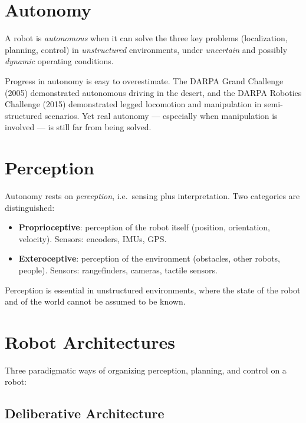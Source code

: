 \section{Autonomy}
\label{sec:autonomy}

\begin{definition}[Autonomy]
A robot is \emph{autonomous} when it can solve the three key problems
(localization, planning, control) in \emph{unstructured} environments,
under \emph{uncertain} and possibly \emph{dynamic} operating conditions.
\end{definition}

Progress in autonomy is easy to overestimate. The DARPA Grand Challenge
(2005) demonstrated autonomous driving in the desert, and the DARPA
Robotics Challenge (2015) demonstrated legged locomotion and
manipulation in semi-structured scenarios. Yet real autonomy ---
especially when manipulation is involved --- is still far from being
solved.

\section{Perception}
\label{sec:perception}

Autonomy rests on \emph{perception}, i.e.\ sensing plus interpretation.
Two categories are distinguished:

\begin{itemize}
    \item \textbf{Proprioceptive}: perception of the robot itself
          (position, orientation, velocity). Sensors: encoders, IMUs, GPS.
    \item \textbf{Exteroceptive}: perception of the environment
          (obstacles, other robots, people). Sensors: rangefinders,
          cameras, tactile sensors.
\end{itemize}

Perception is essential in unstructured environments, where the state of
the robot and of the world cannot be assumed to be known.

\section{Robot Architectures}
\label{sec:architectures}

Three paradigmatic ways of organizing perception, planning, and control
on a robot:

\subsection{Deliberative Architecture}
\label{subsec:deliberative}

